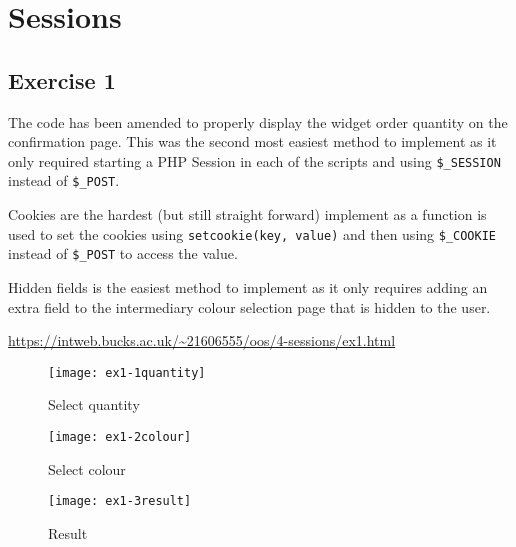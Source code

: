 \chapter{Sessions}
\graphicspath{{4-sessions/images/}}

\section{Exercise 1}

The code has been amended to properly display the widget order quantity on the confirmation page. This was the second most easiest method to implement as it only required starting a PHP Session in each of the scripts and using \texttt{\$\_SESSION} instead of \texttt{\$\_POST}.

Cookies are the hardest (but still straight forward) implement as a function is used to set the cookies using \texttt{setcookie(key, value)} and then using \texttt{\$\_COOKIE} instead of \texttt{\$\_POST} to access the value.

Hidden fields is the easiest method to implement as it only requires adding an extra field to the intermediary colour selection page that is hidden to the user.

\url{https://intweb.bucks.ac.uk/~21606555/oos/4-sessions/ex1.html}

\clearpage
\captionsetup{type=figure}


\clearpage
\captionsetup{type=figure}


\captionsetup{type=figure}


\begin{figure}[H]
  \caption{Select quantity}
  \centering
  \texttt{[image: ex1-1quantity]}
\end{figure}

\begin{figure}[H]
  \caption{Select colour}
  \centering
  \texttt{[image: ex1-2colour]}
\end{figure}

\begin{figure}[H]
  \caption{Result}
  \centering
  \texttt{[image: ex1-3result]}
\end{figure}

